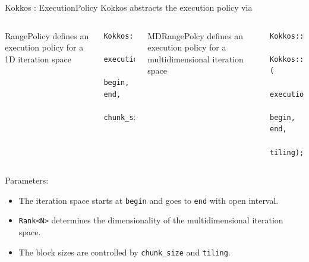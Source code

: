 \begin{frame}[fragile]{Kokkos : Execution}{Policy}
  Kokkos abstracts the execution policy via

  \begin{columns}
      \begin{block}{RangePolicy}
        defines an execution policy for a 1D iteration space
      \end{block}
      \begin{verbatim}
Kokkos::RangePolicy(
  execution_space, 
  begin, end, 
  chunk_size);
      \end{verbatim}
      \begin{block}{MDRangePolcy}
        defines an execution policy for a multidimensional iteration space
      \end{block}
      \begin{verbatim}
Kokkos::MDRangePolicy<
  Kokkos::Rank<N>>(
    execution_space, 
    begin, end, 
    tiling);
  \end{verbatim}
  \end{columns}




  
  \begin{bkblock}{Parameters:}
    \begin{itemize}
      \item The iteration space starts at \verb|begin| and goes to \verb|end| with open interval.
      \item \verb|Rank<N>| determines the dimensionality of the multidimensional iteration space.
      \item The block sizes are controlled by \verb|chunk_size| and \verb|tiling|.
    \end{itemize}
  \end{bkblock}
\end{frame}


